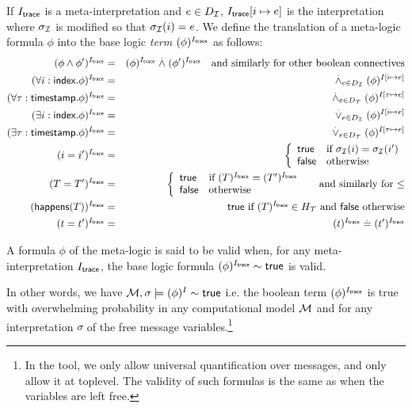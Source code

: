 \begin{definition}
  If $I_{\textsf{trace}}$ is a meta-interpretation and $e\in D_{\mathcal{I}}$,
  $I_{\textsf{trace}}[i\mapsto e]$ is the interpretation where $\sigma_{\mathcal{I}}$ is
  modified so that $\sigma_{\mathcal{I}}(i)=e$.
  We define the translation of a meta-logic formula $\phi$
  into the base logic \emph{term} $(\phi)^{I_{\textsf{trace}}}$
  as follows:
  \begin{eqnarray*}
    (\phi\wedge\phi')^{I_{\textsf{trace}}} &=& (\phi)^{I_{\textsf{trace}}} \stackrel{.}{\wedge} (\phi')^{I_{\textsf{trace}}}
    \quad \text{and similarly for other boolean connectives} \\
    (\forall i:\textsf{index}. \phi)^{I_{\textsf{trace}}} &=&
    \stackrel{.}{\wedge}_{e\in D_{\mathcal{I}}} (\phi)^{I[i\mapsto e]} \\
    (\forall \tau:\textsf{timestamp}. \phi)^{I_{\textsf{trace}}} &=&
    \stackrel{.}{\wedge}_{e\in D_{\mathcal{T}}} (\phi)^{I[\tau\mapsto e]} \\
    (\exists i:\textsf{index}. \phi)^{I_{\textsf{trace}}} &=&
    \stackrel{.}{\vee}_{e\in D_{\mathcal{I}}} (\phi)^{I[i\mapsto e]} \\
    (\exists \tau:\textsf{timestamp}. \phi)^{I_{\textsf{trace}}} &=&
    \stackrel{.}{\vee}_{e\in D_{\mathcal{T}}} (\phi)^{I[\tau\mapsto e]} \\
    (i=i')^{I_{\textsf{trace}}} &=&
    \left\{\begin{array}{ll}
      \mathsf{true} & \text{if } \sigma_{\mathcal{I}}(i)=\sigma_{\mathcal{I}}(i') \\
      \mathsf{false} & \text{otherwise}
    \end{array}\right. \\
    (T = T')^{I_{\textsf{trace}}} &=&
    \left\{\begin{array}{ll}
      \mathsf{true} & \text{if } (T)^{I_{\textsf{trace}}} = (T')^{I_{\textsf{trace}}} \\
      \mathsf{false} & \text{otherwise}
    \end{array}\right.
    \quad\text{ and similarly for $\leq$} \\
    (\textsf{happens}(T))^{I_{\textsf{trace}}} &=& \mathsf{true}
    \text{ if } (T)^{I_{\textsf{trace}}} \in H_{\mathcal{T}}
    \text{ and } \mathsf{false} \text{ otherwise}
    \\
    (t=t')^{I_{\textsf{trace}}} &=& (t)^{I_{\textsf{trace}}} \stackrel{.}{=} (t')^{I_{\textsf{trace}}}
  \end{eqnarray*}
\end{definition}

\begin{definition}
  A formula $\phi$ of the meta-logic is said to be valid when,
  for any meta-interpretation $I_{\textsf{trace}}$, the base logic formula
  $(\phi)^{I_{\textsf{trace}}} \sim \mathsf{true}$ is valid.

  In other words, we have $\mathcal{M},\sigma\models(\phi)^I\sim\mathsf{true}$
  i.e. the boolean term $(\phi)^{I_{\textsf{trace}}}$ is true with overwhelming
  probability in any computational model $\mathcal{M}$ and for any interpretation
  $\sigma$ of the free message variables.\footnote{
  In the tool, we only allow universal quantification over messages, and
  only allow it at toplevel. The validity of such formulas is the same as
  when the variables are left free.}
\end{definition}


